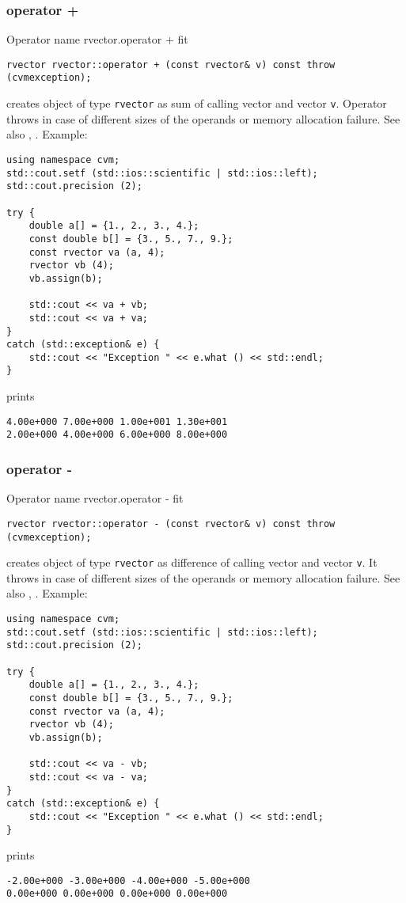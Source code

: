 \subsubsection{operator +}
Operator%
\pdfdest name {rvector.operator +} fit
\begin{verbatim}
rvector rvector::operator + (const rvector& v) const throw (cvmexception);
\end{verbatim}
creates  object of type \verb"rvector" as sum of
 calling vector and vector \verb"v".
Operator throws  
in case of different sizes of the operands
or memory allocation failure.
See also ,
.
Example:
\begin{Verbatim}
using namespace cvm;
std::cout.setf (std::ios::scientific | std::ios::left); 
std::cout.precision (2);

try {
    double a[] = {1., 2., 3., 4.};
    const double b[] = {3., 5., 7., 9.};
    const rvector va (a, 4);
    rvector vb (4);
    vb.assign(b);

    std::cout << va + vb;
    std::cout << va + va;
}
catch (std::exception& e) {
    std::cout << "Exception " << e.what () << std::endl;
}
\end{Verbatim}
prints
\begin{Verbatim}
4.00e+000 7.00e+000 1.00e+001 1.30e+001
2.00e+000 4.00e+000 6.00e+000 8.00e+000
\end{Verbatim}
\newpage


\subsubsection{operator -}
Operator%
\pdfdest name {rvector.operator -} fit
\begin{verbatim}
rvector rvector::operator - (const rvector& v) const throw (cvmexception);
\end{verbatim}
creates  object of type \verb"rvector" as  difference of
 calling vector and vector \verb"v".
It throws  
in case of different sizes of the operands
or memory allocation failure.
See also , .
Example:
\begin{Verbatim}
using namespace cvm;
std::cout.setf (std::ios::scientific | std::ios::left); 
std::cout.precision (2);

try {
    double a[] = {1., 2., 3., 4.};
    const double b[] = {3., 5., 7., 9.};
    const rvector va (a, 4);
    rvector vb (4);
    vb.assign(b);

    std::cout << va - vb;
    std::cout << va - va;
}
catch (std::exception& e) {
    std::cout << "Exception " << e.what () << std::endl;
}
\end{Verbatim}
prints
\begin{Verbatim}
-2.00e+000 -3.00e+000 -4.00e+000 -5.00e+000
0.00e+000 0.00e+000 0.00e+000 0.00e+000
\end{Verbatim}
\newpage


